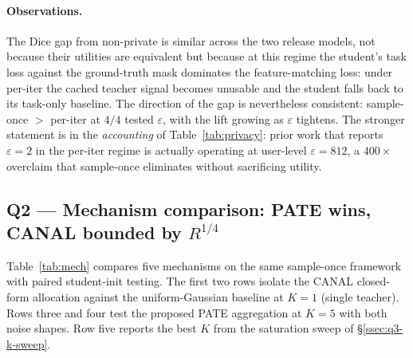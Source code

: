 \paragraph{Observations.}
The Dice gap from non-private is similar across the two release models,
not because their utilities are equivalent but because at this regime
the student's task loss against the ground-truth mask dominates the
feature-matching loss: under per-iter the cached teacher signal becomes
unusable and the student falls back to its task-only baseline. The
direction of the gap is nevertheless consistent: sample-once $>$
per-iter at $4/4$ tested $\varepsilon$, with the lift growing as
$\varepsilon$ tightens. The stronger statement is in the
\emph{accounting} of Table~\ref{tab:privacy}: prior work that
reports $\varepsilon\!=\!2$ in the per-iter regime is actually
operating at user-level $\varepsilon\!=\!812$, a $400\!\times\!$
overclaim that sample-once eliminates without sacrificing utility.

\subsection{Q2 — Mechanism comparison: PATE wins, CANAL bounded by $R^{1/4}$}
\label{ssec:q2-mechanism}

Table~\ref{tab:mech} compares five mechanisms on the same sample-once
framework with paired student-init testing. The first two rows isolate
the CANAL closed-form allocation against the uniform-Gaussian baseline
at $K\!=\!1$ (single teacher). Rows three and four test the proposed
PATE aggregation at $K\!=\!5$ with both noise shapes. Row five reports
the best $K$ from the saturation sweep of \S\ref{ssec:q3-k-sweep}.


